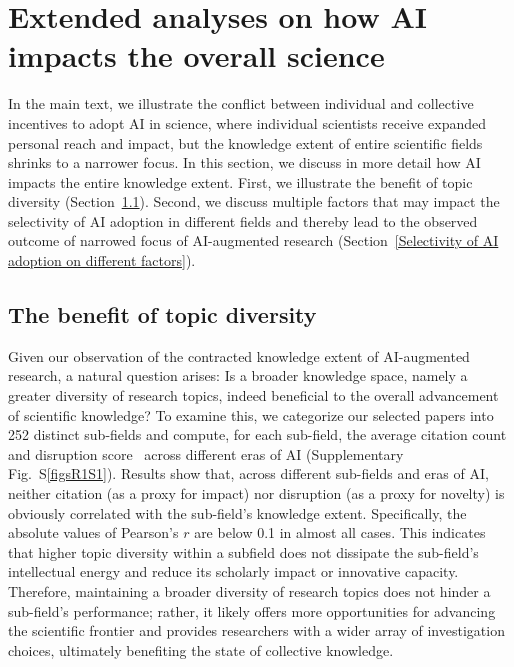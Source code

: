 \section{Extended analyses on how AI impacts the overall science}
In the main text, we illustrate the conflict between individual and collective incentives to adopt AI in science, where individual scientists receive expanded personal reach and impact, but the knowledge extent of entire scientific fields shrinks to a narrower focus.
In this section, we discuss in more detail how AI impacts the entire knowledge extent.
First, we illustrate the benefit of topic diversity (Section~\ref{The benefit of topic diversity}).
Second, we discuss multiple factors that may impact the selectivity of AI adoption in different fields and thereby lead to the observed outcome of narrowed focus of AI-augmented research (Section~\ref{Selectivity of AI adoption on different factors}).

\subsection{The benefit of topic diversity}
\label{The benefit of topic diversity}
Given our observation of the contracted knowledge extent of AI-augmented research, a natural question arises: Is a broader knowledge space, namely a greater diversity of research topics, indeed beneficial to the overall advancement of scientific knowledge?
To examine this, we categorize our selected papers into 252 distinct sub-fields and compute, for each sub-field, the average citation count and disruption score~\supercite{wu2019large,park2023papers} across different eras of AI (Supplementary Fig.~S\ref{figsR1S1}).
Results show that, across different sub-fields and eras of AI, neither citation (as a proxy for impact) nor disruption (as a proxy for novelty) is obviously correlated with the sub-field’s knowledge extent.
Specifically, the absolute values of Pearson’s $r$ are below 0.1 in almost all cases.
This indicates that higher topic diversity within a subfield does not dissipate the sub-field’s intellectual energy and reduce its scholarly impact or innovative capacity.
Therefore, maintaining a broader diversity of research topics does not hinder a sub-field’s performance; rather, it likely offers more opportunities for advancing the scientific frontier and provides researchers with a wider array of investigation choices, ultimately benefiting the state of collective knowledge.



